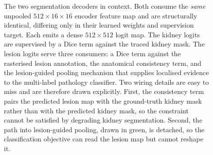 \begin{figure}[htbp]
{}
\caption{The two segmentation decoders in context. Both consume the \emph{same}
unpooled $512{\times}16{\times}16$ encoder feature map and are structurally
identical, differing only in their learned weights and supervision target. Each
emits a dense $512{\times}512$ logit map. The kidney logits are supervised by a
Dice term against the traced kidney mask. The lesion logits serve three
consumers: a Dice term against the rasterised lesion annotation, the anatomical
consistency term, and the lesion-guided pooling mechanism that supplies
localised evidence to the multi-label pathology classifier. Two wiring details
are easy to miss and are therefore drawn explicitly. First, the consistency term
pairs the predicted lesion map with the ground-truth kidney mask rather than
with the predicted kidney mask, so the constraint cannot be satisfied by
degrading kidney segmentation. Second, the path into lesion-guided pooling,
drawn in green, is detached, so the classification objective can read the lesion
map but cannot reshape it.}\label{fig:decoders-combined}
\end{figure}

